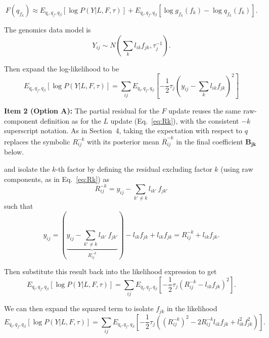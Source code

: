 \documentclass{article}[12pt]
\begin{document}
\begin{equation}
    F\left(q_{f_k}\right) \approx E_{q_l, q_f, q_{\beta}}\left[\log P\left(Y \vert L, F, \tau\right)\right] + E_{q_l, q_f, q_{\beta}}\left[\log g_{f_k}(f_k) - \log q_{f_k}(f_k)\right].
\end{equation}

The genomics data model is
\begin{equation}
    Y_{ij} \sim N\left(\sum_{k}l_{ik}f_{jk}, \tau_{j}^{-1}\right).
\end{equation}

Then expand the log-likelihood to be
\begin{equation}
    E_{q_l, q_f, q_{\beta}}\left[\log P\left(Y \vert L, F, \tau\right)\right] = \sum_{ij}E_{q_l, q_f, q_{\beta}}\left[-\frac{1}{2}\tau_{j}\left(y_{ij} - \sum_{k}l_{ik}f_{jk}\right)^2\right]
\end{equation}

\begin{corrbox}
\textbf{Item 2 (Option A):} The partial residual for the $F$ update reuses the same raw-component
definition as for the $L$ update (Eq.~\ref{eq:Rk}), with the consistent $-k$ superscript
notation. As in Section~4, taking the expectation with respect to $q$ replaces the symbolic
$R^{-k}_{ij}$ with its posterior mean $\overline{R}^{-k}_{ij}$ in the final coefficient
$\mathbf{B_{jk}}$ below.
\end{corrbox}

\medskip
and isolate the $k$-th factor by defining the residual excluding factor $k$ (using raw components, as in Eq.~\ref{eq:Rk}) as
\begin{equation}
    R^{-k}_{ij} = y_{ij}-\sum_{k'\neq k} l_{ik'}\, f_{jk'}
\end{equation}
such that
\begin{equation}
    y_{ij} = \left(\underbrace{y_{ij}-\sum_{k'\neq k} l_{ik'}\, f_{jk'}}_{R^{-k}_{ij}}\right) - l_{ik}f_{jk} + l_{ik}f_{jk}
    = R^{-k}_{ij} + l_{ik}f_{jk}.
\end{equation}

Then substitute this result back into the likelihood expression to get
\begin{equation}
    E_{q_l, q_f, q_{\beta}}\left[\log P\left(Y \vert L, F, \tau\right)\right] = \sum_{ij}E_{q_l, q_f, q_{\beta}}\left[-\frac{1}{2}\tau_{j}\left(R^{-k}_{ij}-l_{ik}f_{jk}\right)^2\right].
\end{equation}

We can then expand the squared term to isolate $f_{jk}$ in the likelihood
\begin{equation}
    E_{q_l, q_f, q_{\beta}}\left[\log P\left(Y \vert L, F, \tau\right)\right] = \sum_{ij}E_{q_l, q_f, q_{\beta}}\left[-\frac{1}{2}\tau_{j}\left(\left(R^{-k}_{ij}\right)^2-2R^{-k}_{ij}l_{ik}f_{jk}+l^{2}_{ik}f^{2}_{jk}\right)\right].
\end{equation}
\end{document}
